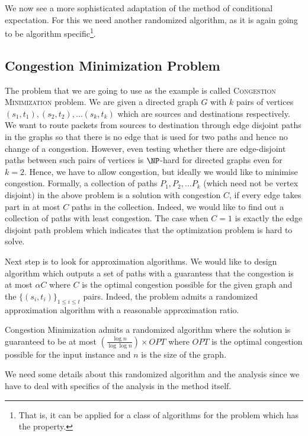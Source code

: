 We now see a more sophisticated adaptation of the method of conditional expectation. For this we need another randomized algorithm, as it is again going to be algorithm specific\footnote{That is, it can be applied for a class of algorithms for the problem which has the property.}.

\subsection{Congestion Minimization Problem}

The problem that we are going to use as the example is called \textsc{Congestion Minimization} problem. We are given a directed graph $G$ with $k$ pairs of vertices $(s_1,t_1),(s_2,t_2), \ldots (s_k,t_k)$ which are sources and destinations respectively. We want to route packets from sources to destination through edge disjoint paths in the graphs so that there is no edge that is used for two paths and hence no change of a congestion. However, even testing whether there are edge-disjoint paths between such pairs of vertices is $\NP$-hard for directed graphs even for $k=2$. Hence, we have to allow congestion, but ideally we would like to minimise congestion. Formally, a collection of paths $P_1, P_2, \ldots P_k$ (which need not be vertex disjoint) in the above problem is a solution with congestion $C$, if every edge takes part in at most $C$ paths in the collection. Indeed, we would like to find out a collection of paths with least congestion. The case when $C=1$ is exactly the edge disjoint path problem which indicates that the optimization problem is hard to solve.

Next step is to look for approximation algorithms. We would like to design algorithm which outputs a set of paths with a guarantess that the congestion is at most $\alpha C$ where $C$ is the optimal congestion possible for the given graph and the $\{(s_i,t_i)\}_{1 \le i \le t}$ pairs. Indeed, the problem admits a randomized approximation algorithm with a reasonable approximation ratio.

\begin{theorem}
{\sc Congestion Minimization} admits a randomized algorithm where the solution is guaranteed to be at most $\left(\frac{\log n}{\log \log n}\right) \times OPT$ where $OPT$ is the optimal congestion possible for the input instance and $n$ is the size of the graph.
\end{theorem}

We need some details about this randomized algorithm and the analysis since we have to deal with specifics of the analysis in the method itself. 

